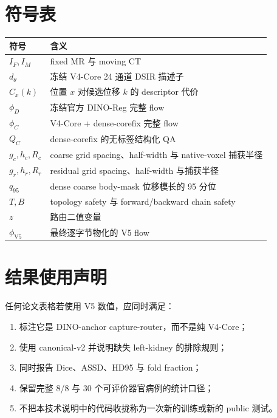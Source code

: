 \documentclass[11pt,a4paper]{ctexart}
\begin{document}
\appendix

\section{符号表}
\begin{longtable}{p{3.0cm}p{11.0cm}}
\toprule
符号 & 含义\\
\midrule
$I_F,I_M$ & fixed MR 与 moving CT\\
$d_\theta$ & 冻结 V4-Core 24 通道 DSIR 描述子\\
$C_x(k)$ & 位置 $x$ 对候选位移 $k$ 的 descriptor 代价\\
$\phi_D$ & 冻结官方 DINO-Reg 完整 flow\\
$\phi_C$ & V4-Core + dense-corefix 完整 flow\\
$Q_C$ & dense-corefix 的无标签结构化 QA\\
$g_c,h_c,R_c$ & coarse grid spacing、half-width 与 native-voxel 捕获半径\\
$g_r,h_r,R_r$ & residual grid spacing、half-width 与捕获半径\\
$q_{95}$ & dense coarse body-mask 位移模长的 95 分位\\
$T,B$ & topology safety 与 forward/backward chain safety\\
$z$ & 路由二值变量\\
$\phi_{\mathrm{V5}}$ & 最终逐字节物化的 V5 flow\\
\bottomrule
\end{longtable}

\section{结果使用声明}
任何论文表格若使用 V5 数值，应同时满足：
\begin{enumerate}
  \item 标注它是 DINO-anchor capture-router，而不是纯 V4-Core；
  \item 使用 canonical-v2 并说明缺失 left-kidney 的排除规则；
  \item 同时报告 Dice、ASSD、HD95 与 fold fraction；
  \item 保留完整 8/8 与 30 个可评价器官病例的统计口径；
  \item 不把本技术说明中的代码收拢称为一次新的训练或新的 public 测试。
\end{enumerate}
\end{document}
